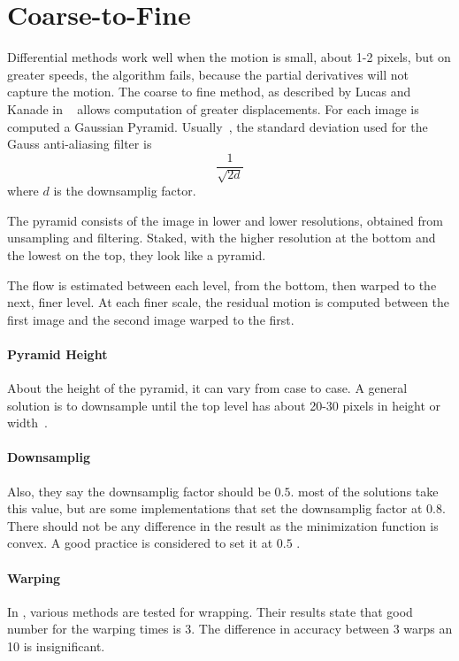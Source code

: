 \documentclass[12pt,a4paper,twoside]{report}
\begin{document}
{\section{Coarse-to-Fine}
Differential methods work well when the motion is small, about 1-2 pixels, but on greater speeds, the algorithm fails, because the partial derivatives will not capture the motion.
The coarse to fine method, as described by Lucas and Kanade in ~\cite{lucas1981} allows computation of greater displacements. For each image is computed a Gaussian Pyramid. Usually~\cite{sun2010}, the standard deviation used for the Gauss anti-aliasing filter is 
\begin{equation}
	\frac{1}{\sqrt{2d}}
\end{equation} where $d$ is the downsamplig factor.

The pyramid consists of the image in lower and lower resolutions, obtained from unsampling and filtering. Staked, with the higher resolution at the bottom and the lowest on the top, they look like a pyramid.

The flow is estimated between each level, from the bottom, then warped to the next, finer level. At each finer scale, the residual motion is computed between the first image and the second image warped to the first. 

\paragraph{Pyramid Height} \label{pyrHeight} About the height of the pyramid, it can vary from case to case. A general solution is to downsample until the top level has about 20-30 pixels in height or width~\cite{sun2010}. 

\paragraph{Downsamplig}Also, they say the downsamplig factor should be $0.5$. most of the solutions take this value, but are some implementations that set the downsamplig factor at $0.8$. There should not be any difference in the result as the minimization function is convex. A good practice is considered to set it at $0.5$ \cite{sun2010}.



\paragraph{Warping}In \cite{sun2010}, various methods are tested for wrapping. Their results state that good number for the warping times is 3. The difference in accuracy between 3 warps an 10 is insignificant.

}
\end{document}
